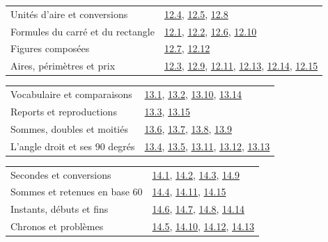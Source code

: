 \begin{tabularx}{\linewidth}{@{}Yl@{}}\toprule
Unités d’aire et conversions & \hyperref[exo-12-4]{12.4}, \hyperref[exo-12-5]{12.5}, \hyperref[exo-12-8]{12.8}\\[2mm]
Formules du carré et du rectangle & \hyperref[exo-12-1]{12.1}, \hyperref[exo-12-2]{12.2}, \hyperref[exo-12-6]{12.6}, \hyperref[exo-12-10]{12.10}\\[2mm]
Figures composées & \hyperref[exo-12-7]{12.7}, \hyperref[exo-12-12]{12.12}\\[2mm]
Aires, périmètres et prix & \hyperref[exo-12-3]{12.3}, \hyperref[exo-12-9]{12.9}, \hyperref[exo-12-11]{12.11}, \hyperref[exo-12-13]{12.13}, \hyperref[exo-12-14]{12.14}, \hyperref[exo-12-15]{12.15}\\[2mm]
\bottomrule\end{tabularx}\par\vspace{4mm}
\clearpage
{}\fontsize{10}{13}\selectfont
{}\begin{tabularx}{\linewidth}{@{}Yl@{}}\toprule
Vocabulaire et comparaisons & \hyperref[exo-13-1]{13.1}, \hyperref[exo-13-2]{13.2}, \hyperref[exo-13-10]{13.10}, \hyperref[exo-13-14]{13.14}\\[2mm]
Reports et reproductions & \hyperref[exo-13-3]{13.3}, \hyperref[exo-13-15]{13.15}\\[2mm]
Sommes, doubles et moitiés & \hyperref[exo-13-6]{13.6}, \hyperref[exo-13-7]{13.7}, \hyperref[exo-13-8]{13.8}, \hyperref[exo-13-9]{13.9}\\[2mm]
L’angle droit et ses 90 degrés & \hyperref[exo-13-4]{13.4}, \hyperref[exo-13-5]{13.5}, \hyperref[exo-13-11]{13.11}, \hyperref[exo-13-12]{13.12}, \hyperref[exo-13-13]{13.13}\\[2mm]
\bottomrule\end{tabularx}\par\vspace{4mm}
\begin{tabularx}{\linewidth}{@{}Yl@{}}\toprule
Secondes et conversions & \hyperref[exo-14-1]{14.1}, \hyperref[exo-14-2]{14.2}, \hyperref[exo-14-3]{14.3}, \hyperref[exo-14-9]{14.9}\\[2mm]
Sommes et retenues en base 60 & \hyperref[exo-14-4]{14.4}, \hyperref[exo-14-11]{14.11}, \hyperref[exo-14-15]{14.15}\\[2mm]
Instants, débuts et fins & \hyperref[exo-14-6]{14.6}, \hyperref[exo-14-7]{14.7}, \hyperref[exo-14-8]{14.8}, \hyperref[exo-14-14]{14.14}\\[2mm]
Chronos et problèmes & \hyperref[exo-14-5]{14.5}, \hyperref[exo-14-10]{14.10}, \hyperref[exo-14-12]{14.12}, \hyperref[exo-14-13]{14.13}\\[2mm]
\bottomrule\end{tabularx}\par\vspace{4mm}
